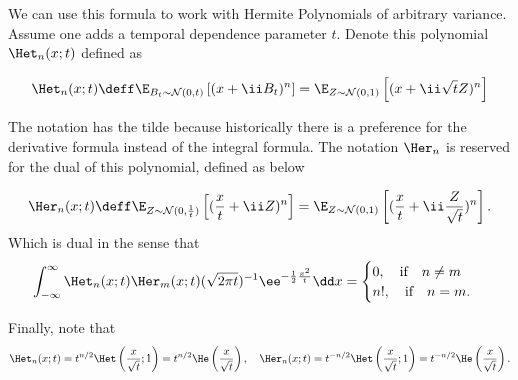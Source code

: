 
We can use this formula to work with Hermite Polynomials of arbitrary variance. Assume one adds a temporal dependence parameter $t$. Denote this polynomial $\Het_n(x;t)$ defined as
\begin{definition}
	\begin{equation}
		\Het_n(x;t) \deff \E_{B_t \sim \mathcal{N}(0,t)}\left[(x+\ii B_t)^n\right] = \E_{Z \sim \mathcal{N}(0,1)}\left[(x+\ii \sqrt{t} Z)^n\right]
	\end{equation}
\end{definition}
The notation has the tilde because historically there is a preference for the derivative formula instead of the integral formula. The notation $\Her_n$ is reserved for the dual of this polynomial, defined as below
\begin{definition}
	\begin{equation}
		\Her_n(x;t) \deff \E_{Z \sim \mathcal{N}(0,\frac{1}{t})}\left[(\frac{x}{t}+\ii Z)^n\right] = \E_{Z \sim \mathcal{N}(0,1)}\left[(\frac{x}{t}+\ii \frac{Z}{\sqrt{t}})^n\right].
	\end{equation}
	Which is dual in the sense that
	\begin{equation}
		\int_{-\infty}^{\infty} \Het_n(x;t) \Her_m(x;t) (\sqrt{2\pi t})^{-1} \ee^{-\frac{1}{2} \frac{x^2}{t}} \dd x = 
		\begin{cases}
			0, \quad \text{if} \quad n \neq m \\
			n!, \quad \text{if} \quad n = m.
		\end{cases}
	\end{equation}
\end{definition}
Finally, note that
\begin{equation}
	\Het_n(x;t) = t^{n/2} \Het\left(\frac{x}{\sqrt{t}};1\right) = t^{n/2} \He\left(\frac{x}{\sqrt{t}}\right), \quad \Her_n(x;t) = t^{-n/2} \Het\left(\frac{x}{\sqrt{t}};1\right) = t^{-n/2} \He\left(\frac{x}{\sqrt{t}}\right).
\end{equation}
